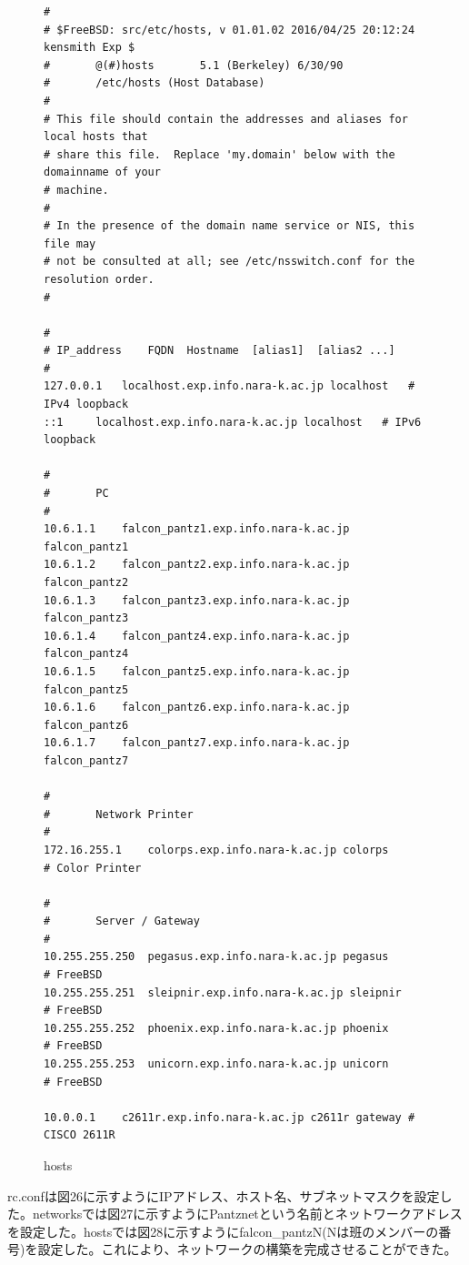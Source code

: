 \documentclass[12pt]{jreport}
\begin{document}
                \begin{figure}[H]
                    \begin{center}
                        \begin{screen}
                            \begin{verbatim}
#
# $FreeBSD: src/etc/hosts, v 01.01.02 2016/04/25 20:12:24 kensmith Exp $
#       @(#)hosts       5.1 (Berkeley) 6/30/90
#       /etc/hosts (Host Database)
#
# This file should contain the addresses and aliases for local hosts that
# share this file.  Replace 'my.domain' below with the domainname of your
# machine.
#
# In the presence of the domain name service or NIS, this file may
# not be consulted at all; see /etc/nsswitch.conf for the resolution order.
#

#
# IP_address    FQDN  Hostname  [alias1]  [alias2 ...]
#
127.0.0.1   localhost.exp.info.nara-k.ac.jp localhost   # IPv4 loopback
::1     localhost.exp.info.nara-k.ac.jp localhost   # IPv6 loopback

#
#       PC
#
10.6.1.1    falcon_pantz1.exp.info.nara-k.ac.jp falcon_pantz1
10.6.1.2    falcon_pantz2.exp.info.nara-k.ac.jp falcon_pantz2
10.6.1.3    falcon_pantz3.exp.info.nara-k.ac.jp falcon_pantz3
10.6.1.4    falcon_pantz4.exp.info.nara-k.ac.jp falcon_pantz4
10.6.1.5    falcon_pantz5.exp.info.nara-k.ac.jp falcon_pantz5
10.6.1.6    falcon_pantz6.exp.info.nara-k.ac.jp falcon_pantz6
10.6.1.7    falcon_pantz7.exp.info.nara-k.ac.jp falcon_pantz7

#
#       Network Printer
#
172.16.255.1    colorps.exp.info.nara-k.ac.jp colorps       # Color Printer

#
#       Server / Gateway
#
10.255.255.250  pegasus.exp.info.nara-k.ac.jp pegasus       # FreeBSD
10.255.255.251  sleipnir.exp.info.nara-k.ac.jp sleipnir     # FreeBSD
10.255.255.252  phoenix.exp.info.nara-k.ac.jp phoenix       # FreeBSD
10.255.255.253  unicorn.exp.info.nara-k.ac.jp unicorn       # FreeBSD

10.0.0.1    c2611r.exp.info.nara-k.ac.jp c2611r gateway # CISCO 2611R
                            \end{verbatim}
                        \end{screen}
                        \caption{hosts}
                        \label{28}
                    \end{center}
                \end{figure}
                rc.confは図26に示すようにIPアドレス、ホスト名、サブネットマスクを設定した。networksでは図27に示すようにPantznetという名前とネットワークアドレスを設定した。hostsでは図28に示すようにfalcon\_pantzN(Nは班のメンバーの番号)を設定した。これにより、ネットワークの構築を完成させることができた。
\end{document}
